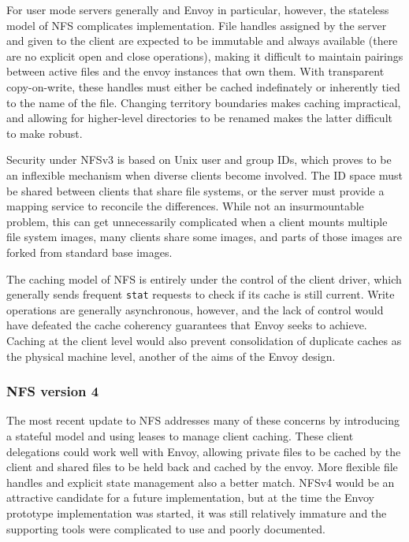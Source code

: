 For user mode servers generally and Envoy in particular, however, the stateless model of NFS complicates implementation. File handles assigned by the server and given to the client are expected to be immutable and always available (there are no explicit open and close operations), making it difficult to maintain pairings between active files and the envoy instances that own them. With transparent copy-on-write, these handles must either be cached indefinately or inherently tied to the name of the file. Changing territory boundaries makes caching impractical, and allowing for higher-level directories to be renamed makes the latter difficult to make robust.

Security under NFSv3 is based on Unix user and group IDs, which proves to be an inflexible mechanism when diverse clients become involved. The ID space must be shared between clients that share file systems, or the server must provide a mapping service to reconcile the differences. While not an insurmountable problem, this can get unnecessarily complicated when a client mounts multiple file system images, many clients share some images, and parts of those images are forked from standard base images.

The caching model of NFS is entirely under the control of the client driver, which generally sends frequent \texttt{stat} requests to check if its cache is still current. Write operations are generally asynchronous, however, and the lack of control would have defeated the cache coherency guarantees that Envoy seeks to achieve. Caching at the client level would also prevent consolidation of duplicate caches as the physical machine level, another of the aims of the Envoy design.

\subsubsection{NFS version 4}

The most recent update to NFS addresses many of these concerns by introducing a stateful model and using leases to manage client caching. These client delegations could work well with Envoy, allowing private files to be cached by the client and shared files to be held back and cached by the envoy. More flexible file handles and explicit state management also a better match. NFSv4 would be an attractive candidate for a future implementation, but at the time the Envoy prototype implementation was started, it was still relatively immature and the supporting tools were complicated to use and poorly documented.

